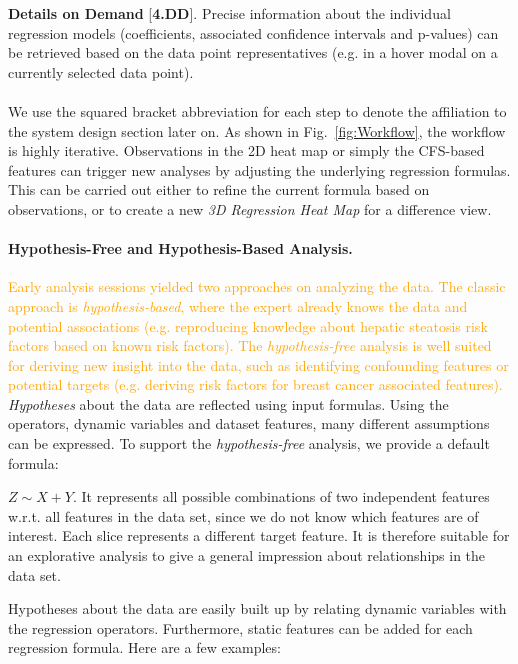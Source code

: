 \documentclass[journal]{style/vgtc} 			          %
\newcommand{\design}[1]{\textcolor{orange}{#1}}
\begin{document}
\textbf{Details on Demand} [\textbf{4.DD}]. Precise information about the individual regression models (coefficients, associated confidence intervals and p-values) can be retrieved based on the data point representatives (e.g. in a hover modal on a currently selected data point).
\\\\
We use the squared bracket abbreviation for each step to denote the affiliation to the system design section later on.
As shown in Fig.~\ref{fig:Workflow}, the workflow is highly iterative.
Observations in the 2D heat map or simply the CFS-based features can trigger new analyses by adjusting the underlying regression formulas.
This can be carried out either to refine the current formula based on observations, or to create a new \emph{3D Regression Heat Map} for a difference view.
\paragraph{Hypothesis-Free and Hypothesis-Based Analysis.}
\design{
Early analysis sessions yielded two approaches on analyzing the data.
The classic approach is \emph{hypothesis-based}, where the expert already knows the data and potential associations (e.g. reproducing knowledge about hepatic steatosis risk factors based on known risk factors).
The \emph{hypothesis-free} analysis is well suited for deriving new insight into the data, such as identifying confounding features or potential targets (e.g. deriving risk factors for breast cancer associated features).
}
\emph{Hypotheses} about the data are reflected using input formulas.
Using the operators, dynamic variables and dataset features, many different assumptions can be expressed.
To support the \emph{hypothesis-free} analysis, we provide a default formula:

$Z \sim X + Y$.
It represents all possible combinations of two independent features w.r.t. all features in the data set, since we do not know which features are of interest.
Each slice represents a different target feature.
It is therefore suitable for an explorative analysis to give a general impression about relationships in the data set.

Hypotheses about the data are easily built up by relating dynamic variables with the regression operators.
Furthermore, static features can be added for each regression formula.
Here are a few examples:
\end{document}
